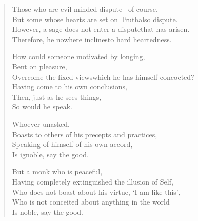 
\begin{verse}

 Those who are evil-minded dispute\newline -- of course.\\
But some whose hearts are set on Truth\newline also dispute.\\
However, a sage does not enter a dispute\newline that has arisen.\\
Therefore, he nowhere inclines\newline to hard heartedness.


 How could someone motivated by longing,\\
Bent on pleasure,\\
Overcome the fixed views\newline which he has himself concocted?\\
Having come to his own conclusions,\\
Then, just as he sees things,\\
So would he speak.


 Whoever unasked,\\
Boasts to others of his precepts and practices,\\
Speaking of himself of his own accord,\\
Is ignoble, say the good.


 But a monk who is peaceful,\\
Having completely extinguished the illusion of Self,\\
Who does not boast about his virtue, `I am like this',\\
Who is not conceited about anything in the world\\
Is noble, say the good.


\end{verse}
